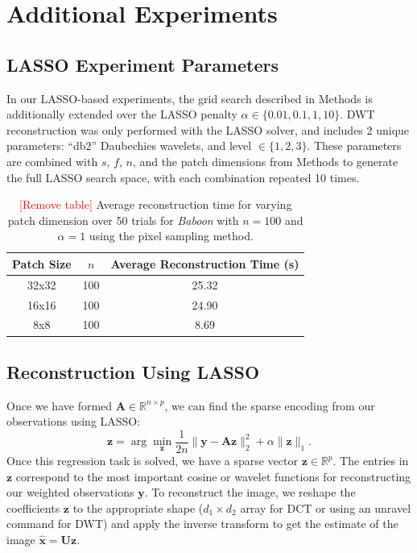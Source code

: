 \documentclass{article}
\newcommand{\todo}[1]{\textcolor{red}{[#1]}}
\renewcommand{\vec}{\mathbf}
\newcommand{\mat}{\mathbf}
\begin{document}
\section{Additional Experiments}
\label{app:additional-experiments}

\subsection{LASSO Experiment Parameters}
In our LASSO-based experiments, the grid search described in Methods is additionally extended over the LASSO penalty $\alpha \in \{0.01, 0.1, 1, 10\}$.
DWT reconstruction was only performed with the LASSO solver, and includes 2 unique parameters: ``db2'' Daubechies wavelets, and level $\in \{1, 2, 3\}$.
These parameters are combined with $s$, $f$, $n$, and the patch dimensions from Methods to generate the full LASSO search space, with each combination repeated 10 times.

\begin{table}[h!]
  \centering
  \begin{tabular}{| c c c |}
    \hline
    Patch Size & $n$ & Average Reconstruction Time (s) \\
    \hline\hline
    32x32 & 100 & 25.32 \\
    \hline
    16x16 & 100 & 24.90\\
    \hline
    8x8 & 100 & 8.69 \\
    \hline
  \end{tabular}
  \caption{
  \todo{Remove table}
  Average reconstruction time for varying patch dimension over 50 trials for \textit{Baboon} with $n=100$ and $\alpha = 1$ using the pixel sampling method.}
  \label{table:times}

\end{table}

\subsection{Reconstruction Using LASSO}
Once we have formed $\mat A \in \mathbb{R}^{n \times p}$, we can find the sparse encoding from our observations using LASSO:
\begin{equation}
\vec z =
\arg \min_{\vec z}
\frac{1}{2n} \| \vec{y} - \mat A \vec z \|_2^2
+ \alpha \| \vec z \|_1.
\end{equation}
Once this regression task is solved, we have a sparse vector $\vec z \in \mathbb{R}^p$.
The entries in $\vec z$ correspond to the most important cosine or wavelet functions for reconstructing our weighted observations $\vec y$.
To reconstruct the image, we reshape the coefficients $\vec z$ to the appropriate shape ($d_1 \times d_2$ array for DCT or using an unravel command for DWT) and apply the inverse transform to get the estimate of the image $\hat{\vec x} = \mat U \vec z$.
\end{document}
